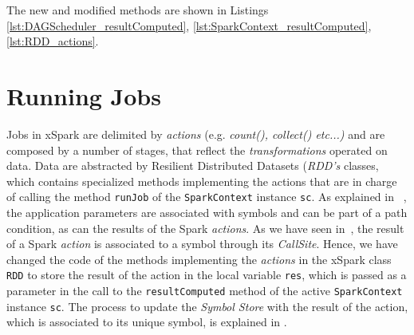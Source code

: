 The new and modified methods are shown in Listings \ref{lst:DAGScheduler_resultComputed}, \ref{lst:SparkContext_resultComputed}, \ref{lst:RDD_actions}.





\section{Running Jobs}\label{sec:running_jobs}
Jobs in xSpark are delimited by \textit{actions} (e.g. \textit{count(), collect()  etc...)} and are composed by a number of stages, that reflect the \textit{transformations} operated on data. Data are abstracted by Resilient Distributed Datasets (\textit{RDD's} classes, which contains specialized methods implementing the actions that are in charge of calling the method \texttt{runJob} of  the \texttt{SparkContext} instance \texttt{sc}. As explained in ~, the application parameters are associated with symbols and can be part of a path condition, as can the results of the Spark \textit{actions}. As we have seen in~, the result of a Spark \textit{action} is associated to a symbol through its \textit{CallSite}. Hence, we have changed the code of the methods implementing the \textit{actions} in the xSpark class \texttt{RDD} to store the result of the action in the local variable \texttt{res}, which is passed as a parameter in the call to the \texttt{resultComputed} method of the active \texttt{SparkContext} instance \texttt{sc}. The process to update the \tool \textit{Symbol Store} with the result of the action, which is associated to its unique symbol, is explained in  .  

